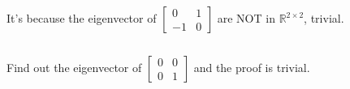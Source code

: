 \documentclass{article}
\newcommand{\tmcolor}[2]{{\color{#1}{#2}}}
\newcommand{\tmdummy}{$\mbox{}$}
\newcommand{\tmverbatim}[1]{\text{{\ttfamily{#1}}}}
\newenvironment{tmindent}{\begin{tmparmod}{1.5em}{0pt}{0pt}}{\end{tmparmod}}
\newenvironment{tmparmod}[3]{\begin{list}{}{\setlength{\topsep}{0pt}\setlength{\leftmargin}{#1}\setlength{\rightmargin}{#2}\setlength{\parindent}{#3}\setlength{\listparindent}{\parindent}\setlength{\itemindent}{\parindent}\setlength{\parsep}{\parskip}} \item[]}{\end{list}}
{\theorembodyfont{\rmfamily\small}\newtheorem{exercise}{Exercise}}
\begin{document}
\begin{exercise}
  \tmverbatim{\tmcolor{red}{I don't understand this problem.}}
\end{exercise}

\begin{exercise}
  {\tmdummy}
  
  \begin{tmindent}
    It's because the eigenvector of $\left[\begin{array}{cc}
      0 & 1\\
      - 1 & 0
    \end{array}\right]$ are NOT in $\mathbb{R}^{2 \times 2}$, trivial.
  \end{tmindent}
\end{exercise}

\begin{exercise}
  {\tmdummy}
  
  \begin{tmindent}
    Find out the eigenvector of $\left[\begin{array}{cc}
      0 & 0\\
      0 & 1
    \end{array}\right]$ and the proof is trivial.
  \end{tmindent}
\end{exercise}

\begin{exercise}
  {\tmdummy}
  
  \begin{tmindent}
    \ 
  \end{tmindent}
\end{exercise}

\begin{exercise}
  {\tmdummy}
  
  \begin{tmindent}
    \ 
  \end{tmindent}
\end{exercise}

\begin{exercise}
  {\tmdummy}
  
  \begin{tmindent}
    \ 
  \end{tmindent}
\end{exercise}

\begin{exercise}
  {\tmdummy}
  
  \begin{tmindent}
    \ 
  \end{tmindent}
\end{exercise}

\begin{exercise}
  {\tmdummy}
  
  \begin{tmindent}
    \ 
  \end{tmindent}
\end{exercise}
\end{document}
